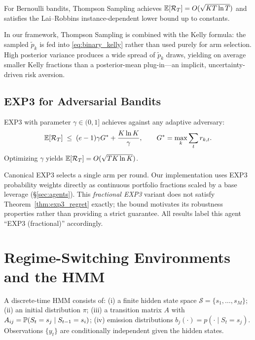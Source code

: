 \begin{theorem}
\label{thm:ts_regret}
For Bernoulli bandits, Thompson Sampling achieves
$\mathbb{E}[\mathcal{R}_T] = O(\sqrt{KT\ln T})$
and satisfies the Lai--Robbins instance-dependent lower bound up to constants.
\end{theorem}

In our framework, Thompson Sampling is combined with the Kelly formula: the
sampled $\tilde p_k$ is fed into \eqref{eq:binary_kelly} rather than used
purely for arm selection.  High posterior variance produces a wide spread of
$\tilde p_k$ draws, yielding on average smaller Kelly fractions than a
posterior-mean plug-in---an implicit, uncertainty-driven risk aversion.

\subsection{EXP3 for Adversarial Bandits}

\begin{theorem}
\label{thm:exp3_regret}
EXP3 with parameter $\gamma\in(0,1]$ achieves against any adaptive adversary:
\[
    \mathbb{E}[\mathcal{R}_T] \;\leq\;
    (e-1)\gamma G^* + \frac{K\ln K}{\gamma},
    \qquad
    G^* = \max_k\sum_t r_{k,t}.
\]
Optimizing $\gamma$ yields $\mathbb{E}[\mathcal{R}_T] = O(\sqrt{TK\ln K})$.
\end{theorem}

\begin{remark}
\label{rem:exp3_variant}
Canonical EXP3 selects a single arm per round.  Our implementation uses EXP3
probability weights directly as continuous portfolio fractions scaled by a base
leverage (\S\ref{sec:agents}).  This \emph{fractional EXP3} variant does not
satisfy Theorem~\ref{thm:exp3_regret} exactly; the bound motivates its
robustness properties rather than providing a strict guarantee.  All results
label this agent ``EXP3 (fractional)'' accordingly.
\end{remark}

\section{Regime-Switching Environments and the HMM}

\begin{definition}
\label{def:hmm}
A discrete-time HMM consists of:
(i) a finite hidden state space $\mathcal{S} = \{s_1,\ldots,s_M\}$;
(ii) an initial distribution $\pi$;
(iii) a transition matrix $A$ with $A_{ij} = \mathbb{P}(S_t=s_j \mid S_{t-1}=s_i)$;
(iv) emission distributions $b_j(\cdot) = p(\cdot \mid S_t=s_j)$.
Observations $\{y_t\}$ are conditionally independent given the hidden states.
\end{definition}

